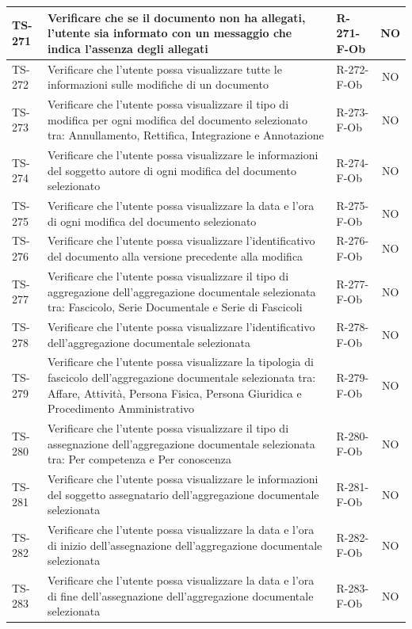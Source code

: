 \documentclass[a4paper,12pt]{article}
\begin{document}
\begin{longtable}{|p{1.5cm}|p{8.3cm}|p{2.4cm}|c|}
\hline
TS-271 & Verificare che se il documento non ha allegati, l'utente sia informato con un messaggio che indica l'assenza degli allegati & R-271-F-Ob & NO \\
\hline
TS-272 & Verificare che l'utente possa visualizzare tutte le informazioni sulle modifiche di un documento & R-272-F-Ob & NO \\
\hline
TS-273 & Verificare che l'utente possa visualizzare il tipo di modifica per ogni modifica del documento selezionato tra: Annullamento, Rettifica, Integrazione e Annotazione & R-273-F-Ob & NO \\
\hline
TS-274 & Verificare che l'utente possa visualizzare le informazioni del soggetto autore di ogni modifica del documento selezionato & R-274-F-Ob & NO \\
\hline
TS-275 & Verificare che l'utente possa visualizzare la data e l'ora di ogni modifica del documento selezionato & R-275-F-Ob & NO \\
\hline
TS-276 & Verificare che l'utente possa visualizzare l'identificativo del documento alla versione precedente alla modifica & R-276-F-Ob & NO \\
\hline
TS-277 & Verificare che l'utente possa visualizzare il tipo di aggregazione dell'aggregazione documentale selezionata tra: Fascicolo, Serie Documentale e Serie di Fascicoli & R-277-F-Ob & NO \\
\hline
TS-278 & Verificare che l'utente possa visualizzare l'identificativo dell'aggregazione documentale selezionata & R-278-F-Ob & NO \\
\hline
TS-279 & Verificare che l'utente possa visualizzare la tipologia di fascicolo dell'aggregazione documentale selezionata tra: Affare, Attività, Persona Fisica, Persona Giuridica e Procedimento Amministrativo & R-279-F-Ob & NO \\
\hline
TS-280 & Verificare che l'utente possa visualizzare il tipo di assegnazione dell'aggregazione documentale selezionata tra: Per competenza e Per conoscenza & R-280-F-Ob & NO \\
\hline
TS-281 & Verificare che l'utente possa visualizzare le informazioni del soggetto assegnatario dell'aggregazione documentale selezionata & R-281-F-Ob & NO \\
\hline
TS-282 & Verificare che l'utente possa visualizzare la data e l'ora di inizio dell'assegnazione dell'aggregazione documentale selezionata & R-282-F-Ob & NO \\
\hline
TS-283 & Verificare che l'utente possa visualizzare la data e l'ora di fine dell'assegnazione dell'aggregazione documentale selezionata & R-283-F-Ob & NO \\

\end{longtable}
\end{document}
